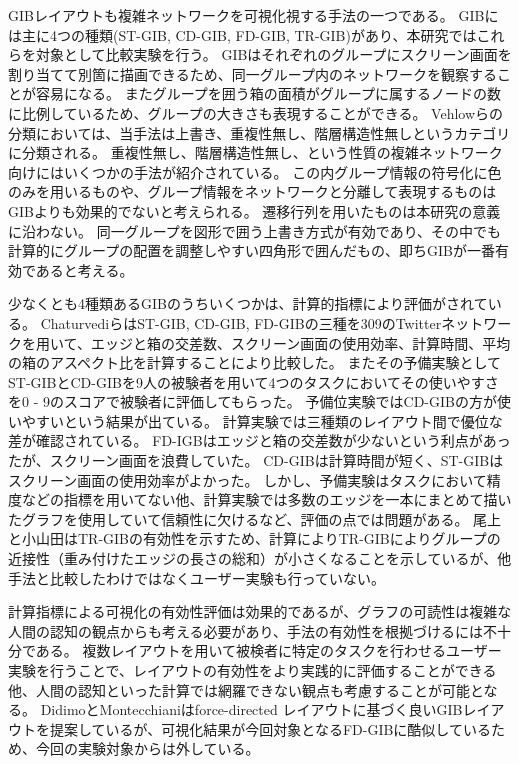 \documentclass{kuee}
\begin{document}
GIBレイアウトも複雑ネットワークを可視化視する手法の一つである\cite{rodrigues2011group,chaturvedi2014group,onoue2017optimal}。
GIBには主に4つの種類(ST-GIB, CD-GIB, FD-GIB, TR-GIB)があり、本研究ではこれらを対象として比較実験を行う。
GIBはそれぞれのグループにスクリーン画面を割り当てて別箇に描画できるため、同一グループ内のネットワークを観察することが容易になる。
またグループを囲う箱の面積がグループに属するノードの数に比例しているため、グループの大きさも表現することができる。
Vehlowらの分類においては、当手法は上書き、重複性無し、階層構造性無しというカテゴリに分類される。
重複性無し、階層構造性無し、という性質の複雑ネットワーク向けにはいくつかの手法が紹介されている\cite{chaturvedi2014group,henry2007nodetrix,shneiderman2006network,bach2013graphdiaries,dekker2001visualisation}。
この内グループ情報の符号化に色のみを用いるものや、グループ情報をネットワークと分離して表現するものはGIBよりも効果的でないと考えられる。
遷移行列を用いたものは本研究の意義に沿わない。
同一グループを図形で囲う上書き方式が有効であり、その中でも計算的にグループの配置を調整しやすい四角形で囲んだもの、即ちGIBが一番有効であると考える。

少なくとも4種類あるGIBのうちいくつかは、計算的指標により評価がされている。
ChaturvediらはST-GIB, CD-GIB, FD-GIBの三種を309のTwitterネットワークを用いて、エッジと箱の交差数、スクリーン画面の使用効率、計算時間、平均の箱のアスペクト比を計算することにより比較した\cite{chaturvedi2014group}。
またその予備実験としてST-GIBとCD-GIBを9人の被験者を用いて4つのタスクにおいてその使いやすさを0 - 9のスコアで被験者に評価してもらった。
予備位実験ではCD-GIBの方が使いやすいという結果が出ている。
計算実験では三種類のレイアウト間で優位な差が確認されている。
FD-IGBはエッジと箱の交差数が少ないという利点があったが、スクリーン画面を浪費していた。
CD-GIBは計算時間が短く、ST-GIBはスクリーン画面の使用効率がよかった。
しかし、予備実験はタスクにおいて精度などの指標を用いてない他、計算実験では多数のエッジを一本にまとめて描いたグラフを使用していて信頼性に欠けるなど、評価の点では問題がある。
尾上と小山田はTR-GIBの有効性を示すため、計算によりTR-GIBによりグループの近接性（重み付けたエッジの長さの総和）が小さくなることを示しているが、他手法と比較したわけではなくユーザー実験も行っていない\cite{onoue2017optimal}。

計算指標による可視化の有効性評価は効果的であるが、グラフの可読性は複雑な人間の認知の観点からも考える必要があり、手法の有効性を根拠づけるには不十分である。
複数レイアウトを用いて被検者に特定のタスクを行わせるユーザー実験を行うことで、レイアウトの有効性をより実践的に評価することができる他、人間の認知といった計算では網羅できない観点も考慮することが可能となる。
DidimoとMontecchianiはforce-directed レイアウトに基づく良いGIBレイアウトを提案しているが\cite{6295786}、可視化結果が今回対象となるFD-GIBに酷似しているため、今回の実験対象からは外している。
\end{document}
